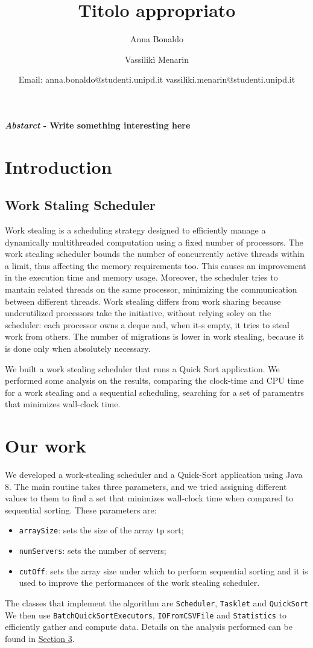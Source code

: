 \documentclass[twocolumn]{article}
\title{\LARGE \textbf{Titolo appropriato}}
\author{Anna Bonaldo \and Vassilikì Menarin }
\date{\small {Email: anna.bonaldo@studenti.unipd.it vassiliki.menarin@studenti.unipd.it }}
\def\code#1{\texttt{#1}}
\begin{document}
	

	\maketitle
	
	\textbf{\textit{Abstarct} - Write something interesting here}

	
	\section{Introduction}
	\subsection{Work Staling Scheduler}
	Work stealing is a scheduling strategy designed to efficiently manage a dynamically multithreaded computation using a fixed number of processors. The work stealing scheduler bounds the number of concurrently active threads within a limit, thus affecting the memory requirements too. This causes an improvement in the execution time and memory usage. Moreover, the scheduler tries to mantain related threads on the same processor, minimizing the communication between different threads.
	Work stealing differs from work sharing because underutilized processors take the initiative, without relying soley on the scheduler: each processor owns a deque and, when it-s empty, it tries to steal work from others. The number of migrations is lower in work stealing, because it is done only when absolutely necessary.
	
	We built a work stealing scheduler that runs a Quick Sort application. We performed some analysis on the results, comparing the clock-time and CPU time for a work stealing and a sequential scheduling, searching for a set of paramentrs that minimizes wall-clock time.
	
	\section{Our work}
	We developed a work-stealing scheduler and a Quick-Sort application using Java 8. The main routine takes three parameters, and we tried assigning different values to them to find a set that minimizes wall-clock time when compared to sequential sorting. These parameters are:
	\begin{itemize}
		\item \code{arraySize}: sets the size of the array tp sort;
		\item \code{numServers}: sets the number of servers;
		\item \code{cutOff}: sets the array size under which to perform sequential sorting and it is used to improve the performances of the work stealing scheduler.
	\end{itemize}
	The classes that implement the algorithm are \code{Scheduler}, \code{Tasklet} and \code{QuickSort} We then use \code{BatchQuickSortExecutors}, \code{IOFromCSVFile} and \code{Statistics} to efficiently gather and compute data.
	Details on the analysis performed can be found in \href{analysis}{Section 3}.
	
\end{document}
